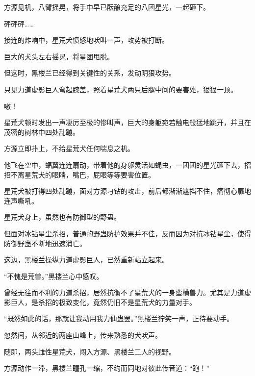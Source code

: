 \begin{this_body}
方源见机，八臂摇晃，将手中早已酝酿充足的八团星光，一起砸下。

砰砰砰……

接连的炸响中，星荒犬愤怒地吠叫一声，攻势被打断。

巨大的犬头左右摇晃，将星团甩脱。

但这时，黑楼兰已经得到关键性的关系，发动阴狠攻势。

只见力道虚影巨人弯起膝盖，照着星荒犬两只后腿中间的要害处，狠狠一顶。

嗷！

星荒犬顿时发出一声凄厉至极的惨叫声，巨大的身躯宛若触电般猛地跳开，并且在茂密的树林中四处乱蹦。

方源立即扑上，不给星荒犬任何喘息之机。

他飞在空中，蝠翼连连扇动，带着他的身躯灵活如蝇虫，一团团的星光砸下去，招招不离星荒犬的眼睛，嘴巴，屁眼等等要害位置。

星荒犬被打得四处乱蹦，面对方源刁钻的攻击，前后都渐渐遮挡不住，痛彻心扉地连声嘶吼。

星荒犬身上，虽然也有防御型的野蛊。

但面对冰钻星尘杀招，普通的野蛊防护效果并不佳，反而因为对抗冰钻星尘，使得防御野蛊不断地迅速消亡。

这边，黑楼兰操纵力道虚影巨人，已然重新站立起来。

“不愧是荒兽。”黑楼兰心中感叹。

曾经无往而不利的力道杀招，居然抗衡不了星荒犬的一身蛮横兽力。尤其是力道虚影巨人，是杀招的极致变化，竟然仍旧不是星荒犬的力量对手。

“既然如此的话，那就让我动用我力仙蛊罢。”黑楼兰狞笑一声，正待要动手。

忽然间，从邻近的两座山峰上，传来熟悉的犬吠声。

随即，两头雌性星荒犬，闯入方源、黑楼兰二人的视野。

方源动作一滞，黑楼兰瞳孔一缩，不约而同地对彼此传音道：“跑！”

\end{this_body}

